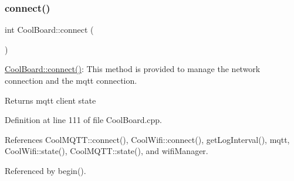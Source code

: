 \subsubsection{\texorpdfstring{connect()}{connect()}}
{\footnotesize\ttfamily int Cool\+Board\+::connect (\begin{DoxyParamCaption}{ }\end{DoxyParamCaption})}

\hyperlink{classCoolBoard_a519de78b807f8ec6463ff484eb925918}{Cool\+Board\+::connect()}\+: This method is provided to manage the network connection and the mqtt connection.

\begin{DoxyReturn}{Returns}
mqtt client state 
\end{DoxyReturn}


Definition at line 111 of file Cool\+Board.\+cpp.



References Cool\+M\+Q\+T\+T\+::connect(), Cool\+Wifi\+::connect(), get\+Log\+Interval(), mqtt, Cool\+Wifi\+::state(), Cool\+M\+Q\+T\+T\+::state(), and wifi\+Manager.



Referenced by begin().


